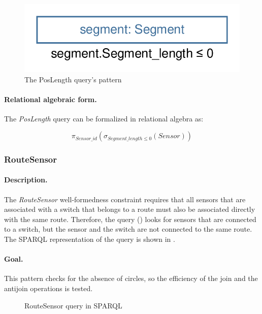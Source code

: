 \begin{figure}[Htb]
		\centering
		\includegraphics[scale=0.4]{figures/trainbenchmark-poslength}
		\caption{The PosLength query's pattern}
		\label{fig:trainbenchmark-poslength}
\end{figure}

\paragraph{Relational algebraic form.} The \textit{PosLength} query can be formalized in relational algebra as:

$$ \pi_{\mathit{Sensor\_id}} \left( \sigma_{\mathit{Segment\_length} \leq 0} \left( \mathit{Sensor} \right) \right) $$

\subsubsection{RouteSensor}

\paragraph{Description.} The \textit{RouteSensor} well-formedness constraint requires that all sensors that are associated with a switch that belongs to a route must also be associated directly with the same route. Therefore, the query () looks for sensors that are connected to a switch, but the sensor and the switch are not connected to the same route. The SPARQL representation of the query is shown in .

\paragraph{Goal.} This pattern checks for the absence of circles, so the efficiency of the join and the antijoin operations is tested.

\begin{figure}[Htb]
\centering
\begin{minipage}{0.5\textwidth}
  { \alignListing
    }
  \caption{RouteSensor query in SPARQL}
  \label{lst:routesensor-sparql-nac}
\end{minipage}
\end{figure}

